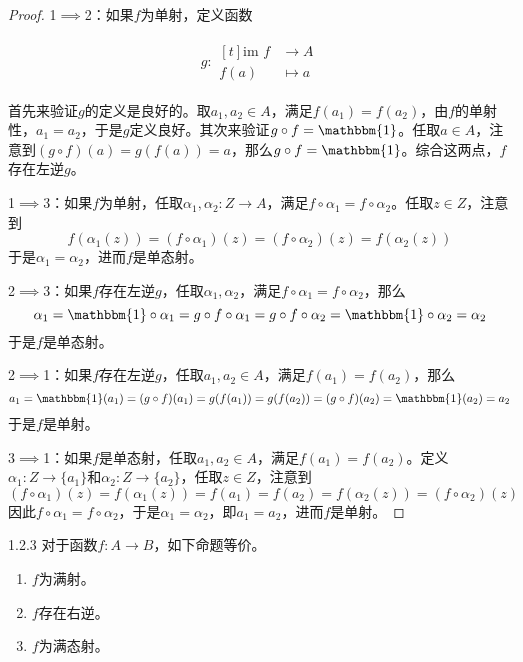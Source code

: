 \documentclass[lang = cn, scheme = chinese, thmcnt = section]{elegantbook}
\newcommand{\function}[5]{
	\begin{align*}
		#1:\begin{aligned}[t]
			#2 &\longrightarrow #3\\
			#4 &\longmapsto #5
		\end{aligned}
	\end{align*}
}                                     %
\begin{document}
\begin{proof}
	1$\implies$2：如果$f$为单射，定义函数
	\function{g}{\text{im }f}{A}{f(a)}{a}
	首先来验证$g$的定义是良好的。取$a_1,a_2\in A$，满足$f(a_1)=f(a_2)$，由$f$的单射性，$a_1=a_2$，于是$g$定义良好。其次来验证$g\circ f=\mathbbm{1}$。任取$a\in A$，注意到$(g\circ f)(a)=g(f(a))=a$，那么$g\circ f=\mathbbm{1}$。综合这两点，$f$存在左逆$g$。
	
	1$\implies$3：如果$f$为单射，任取$\alpha_1,\alpha_2:Z\to A$，满足$f\circ \alpha_1=f\circ \alpha_2$。任取$z\in Z$，注意到
	$$
	f(\alpha_1(z))=(f\circ \alpha_1)(z)=(f\circ \alpha_2)(z)=f(\alpha_2(z))
	$$
	于是$\alpha_1=\alpha_2$，进而$f$是单态射。
	
	2$\implies $3：如果$f$存在左逆$g$，任取$\alpha_1,\alpha_2$，满足$f\circ \alpha_1=f\circ \alpha_2$，那么
	$$
	\alpha_1=\mathbbm{1}\circ \alpha_1=g\circ f\circ \alpha_1=g\circ f\circ \alpha_2=\mathbbm{1}\circ \alpha_2=\alpha_2
	$$
	于是$f$是单态射。
	
	2$\implies $1：如果$f$存在左逆$g$，任取$a_1,a_2\in A$，满足$f(a_1)=f(a_2)$，那么
	$$
	a_1=\mathbbm{1}(a_1)=(g\circ f)(a_1)=g(f(a_1))=g(f(a_2))=(g\circ f)(a_2)=\mathbbm{1}(a_2)=a_2
	$$
	于是$f$是单射。
	
	3$\implies$1：如果$f$是单态射，任取$a_1,a_2\in A$，满足$f(a_1)=f(a_2)$。定义$\alpha_1:Z\to \{a_1\}$和$\alpha_2:Z\to \{a_2\}$，任取$z\in Z$，注意到
	$$
	(f\circ \alpha_1)(z)=f(\alpha_1(z))=f(a_1)=f(a_2)=f(\alpha_2(z))=(f\circ \alpha_2)(z)
	$$
	因此$f\circ\alpha_1=f\circ\alpha_2$，于是$\alpha_1=\alpha_2$，即$a_1=a_2$，进而$f$是单射。
\end{proof}

\begin{theorem}{}{1.2.3}
	对于函数$f:A\to B$，如下命题等价。
	\begin{enumerate}
		\item $f$为满射。
		\item $f$存在右逆。
		\item $f$为满态射。
	\end{enumerate}
\end{theorem}
\end{document}
